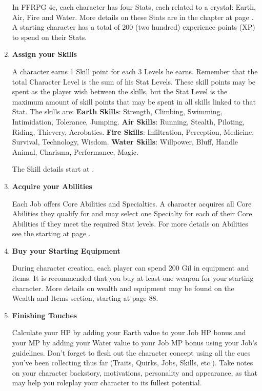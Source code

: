 \begin{multicols}{2}
\begin{enumerate}
In FFRPG 4e, each character has four Stats, each related to a crystal: Earth, Air, Fire and Water. More details on these Stats are in the  chapter at page \pageref{subsec:stats}. A starting character has a total of 200 (two hundred) experience points (XP) to spend on their Stats. 

\item \textbf{Assign your Skills}

A character earns 1 Skill point for each 3 Levels he earns. Remember that the total Character Level is the sum of his Stat Levels. These skill points may be spent as the player wish between the skills, but the Stat Level is the maximum amount of skill points that may be spent in all skills linked to that Stat. The skills are:
\textbf{Earth Skills}: Strength, Climbing, Swimming, Intimidation, Tolerance, Jumping.
\textbf{Air Skills}: Running, Stealth, Piloting, Riding, Thievery, Acrobatics.
\textbf{Fire Skills}: Infiltration, Perception, Medicine, Survival, Technology, Wisdom.
\textbf{Water Skills}: Willpower, Bluff, Handle Animal, Charisma, Performance, Magic.

The Skill details start at \pageref{subsec:skills}.

\item \textbf{Acquire your Abilities}

Each Job offers Core Abilities and Specialties. A character acquires all Core Abilities they qualify for and may select one Specialty for each of their Core Abilities if they meet the required Stat levels. For more details on Abilities see the  starting at page \pageref{sec:combat}. 

\item \textbf{Buy your Starting Equipment}

During character creation, each player can spend 200 Gil in equipment and items. It is recommended that you buy at least one weapon for your starting character. More details on wealth and equipment may be found on the Wealth and Items section, starting at page 88.

\item \textbf{Finishing Touches}

Calculate your HP by adding your Earth value to your Job HP bonus and your MP by adding your Water value to your Job MP bonus using your Job's guidelines. Don't forget to flesh out the character concept using all the cues you've been collecting thus far (Traits, Quirks, Jobs, Skills, etc.). Take notes on your character backstory, motivations, personality and appearance, as that may help you roleplay your character to its fullest potential.

\end{enumerate}
\end{multicols}

